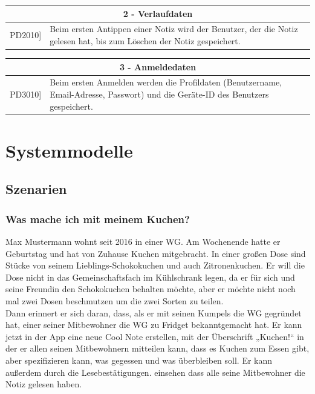 \documentclass[a4paper]{scrreprt}
\begin{document}
    	\begin{table}[h!]
    		\centering
    		\label{my-label}
    		\begin{tabular}{p{2cm}p{12cm}}
    			
    			\multicolumn{2}{c}{\textbf{2 - Verlaufdaten}} \\ \hline
    			\centering{[}PD2010{]} & Beim ersten Antippen einer Notiz wird der Benutzer, der die Notiz gelesen hat, bis zum Löschen der Notiz gespeichert.\\ 
    			\hline
    		\end{tabular}
    	\end{table}
    	
    	\begin{table}[h!]
    		\centering
    		\label{my-label}
    		\begin{tabular}{p{2cm}p{12cm}}
    			
    			\multicolumn{2}{c}{\textbf{3 - Anmeldedaten}} \\ \hline
    			\centering{[}PD3010{]} & Beim ersten Anmelden werden die Profildaten (Benutzername, Email-Adresse, Passwort) und die Geräte-ID des Benutzers gespeichert.\\ 
    			\hline
    		\end{tabular}
    	\end{table}
    
    \chapter{Systemmodelle}
        \section{Szenarien}
        
        
        \subsection{Was mache ich mit meinem Kuchen?}
        Max Mustermann wohnt seit 2016 in einer WG. Am Wochenende hatte er Geburtstag und hat von Zuhause Kuchen mitgebracht. In einer großen Dose sind Stücke von seinem Lieblings-Schokokuchen und auch Zitronenkuchen. Er will die Dose nicht in das Gemeinschaftsfach im Kühlschrank legen, da er für sich und seine Freundin den Schokokuchen behalten möchte, aber er möchte nicht noch mal zwei Dosen beschmutzen um die zwei Sorten zu teilen.\\
        Dann erinnert er sich daran, dass, als er mit seinen Kumpels die WG gegründet hat, einer seiner Mitbewohner die WG zu Fridget bekanntgemacht hat. Er kann jetzt in der App eine neue Cool Note erstellen, mit der Überschrift „Kuchen!“ in der er allen seinen Mitbewohnern mitteilen kann, dass es Kuchen zum Essen gibt, aber spezifizieren kann, was gegessen und was überbleiben soll. Er kann außerdem durch die Lesebestätigungen. einsehen dass alle seine Mitbewohner die Notiz gelesen haben.
        \\
        
\end{document}

